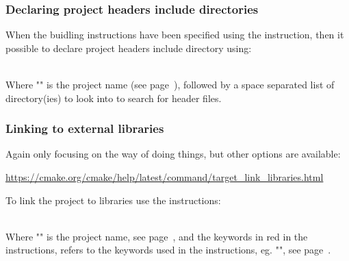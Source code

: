 \subsubsection*{Declaring project headers include directories}

When the buidling instructions have been specified using the  instruction, then it possible to declare project headers include directory using: 
\begin{script}
\end{script} \\[-0.5cm]
\noindent Where "" is the project name (see page~\pageref{cmake_pname}), followed by a space separated list of directory(ies) to look into to search for header files. 

\subsubsection*{Linking to external libraries}
\label{clink}
Again only focusing on the  way of doing things, but other options are available:
\begin{center}\href{https://cmake.org/cmake/help/latest/command/target\_link\_libraries.html}{https://cmake.org/cmake/help/latest/command/target\_link\_libraries.html} \end{center}
To link the project to libraries use the  instructions:
\begin{script}
\end{script}
\\[-0.25cm]
\noindent Where "" is the project name, see page~\pageref{cmake_pname}, and the keywords in red in the  instructions, 
refers to the keywords used in the  instructions, eg. "\texttt{}", see page~\pageref{cmake_deps}.


